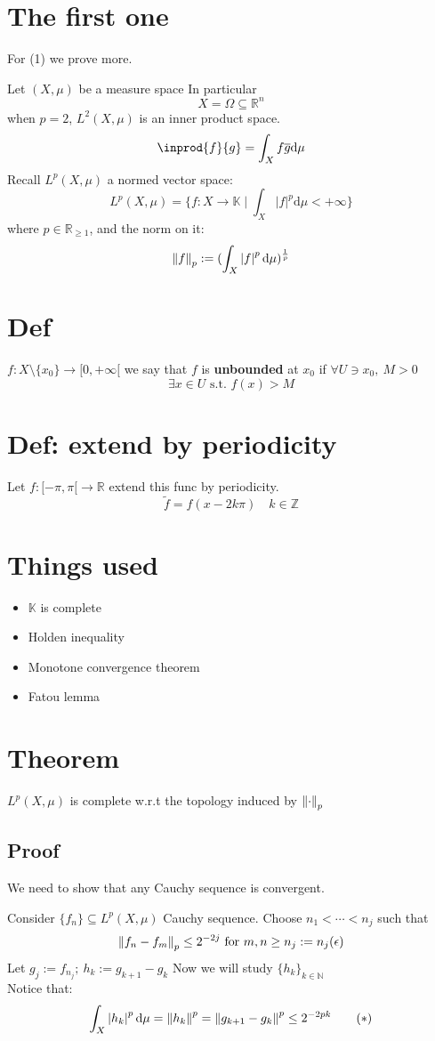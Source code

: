 \documentclass{book}
\newcommand{\abs}[1]{\left\lvert #1 \right\rvert}
\newcommand{\leftbracket}{[}
\begin{document}
\section{The first one}
For (1) we prove more.

Let $(X,\mu)$ be a measure space 
In particular$$X=\Omega\subseteq\mathbb{R}^n$$
when $p=2$, $L^2(X,\mu)$ is an inner product space.$$\inprod{f}{g}=\int_Xf\overline g\text{d}\mu$$
Recall $L^p(X,\mu)$ a normed vector space:
$$L^p(X,\mu)=\{f:X\rightarrow\mathbb{K}\mid\int_X\abs{f}^p\text{d}\mu<+\infty\}$$
where $p\in \mathbb{R}_{\geq 1}$, and the norm on it:
$$\norm{f}_p:=(\int_X\abs{f}^p\text{d}\mu)^{\frac{1}{p}}$$
\section{Def}
$f:X\setminus\{x_0\}\rightarrow\leftbracket 0,+\infty\leftbracket$ we say that $f$ is \textbf{unbounded} at $x_0$ if $\forall U\ni x_0,\ M>0$$$ \exists x\in U \text{ s.t. }f(x)>M$$
\section{Def: extend by periodicity}
Let $f:\leftbracket -\pi,\pi\leftbracket\rightarrow \mathbb{R}$ extend this func by periodicity.
$$\tilde{f}=f(x-2k\pi)\quad k\in\mathbb{Z}$$
\section{Things used}
\begin{itemize}
    \item $\mathbb{K}$ is complete
    \item Holden inequality
    \item Monotone convergence theorem
    \item Fatou lemma
\end{itemize}
\section{Theorem}
\label{Lp complete}
$L^p(X,\mu)$ is complete w.r.t the topology induced by $\left\lVert \cdot \right\rVert_p$
\subsection*{Proof}
We need to show that any Cauchy sequence is convergent.

Consider $\{f_n\}\subseteq L^p(X,\mu)$ Cauchy sequence. Choose $n_1<\cdots<n_j$ such that$$\left\lVert f_n-f_m \right\rVert_p\leq 2^{-2j}\text{ for }m,n\geq n_j:=n_j(\epsilon)$$
Let $g_j:=f_{n_j};\ h_k:=g_{k+1}-g_k$ Now we will study $\{h_k\}_{k\in \mathbb{N}}$ \label{69.4.(1)}\\Notice that:
$$\int_X\abs{h_k}^p\text{d}\mu=\norm{h_k}^p=\norm{g_{k+1}-g_k}^p\leq 2^{-2pk}\qquad (*)$$
\end{document}
